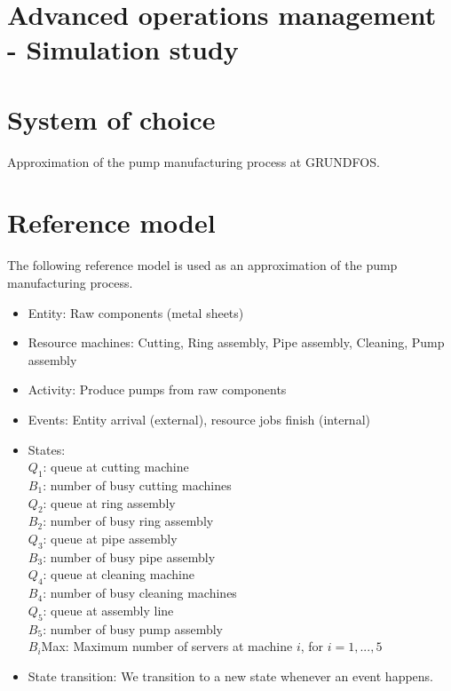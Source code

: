 \documentclass{article}
\begin{document}
\section*{Advanced operations management - Simulation study}

\section{System of choice}
Approximation of the pump manufacturing process at GRUNDFOS.

\section{Reference model}
The following reference model is used as an approximation of the pump manufacturing process.
\begin{itemize}
    \item Entity: Raw components (metal sheets)
    \item Resource machines: Cutting, Ring assembly, Pipe assembly, Cleaning, Pump assembly
    \item Activity: Produce pumps from raw components
    \item Events: Entity arrival (external), resource jobs finish (internal)
    \item States:\\
        $Q_1$: queue at cutting machine \\
        $B_1$: number of busy cutting machines \\
        $Q_2$: queue at ring assembly \\
        $B_2$: number of busy ring assembly \\
        $Q_3$: queue at pipe assembly \\
        $B_3$: number of busy pipe assembly \\
        $Q_4$: queue at cleaning machine \\
        $B_4$: number of busy cleaning machines \\
        $Q_5$: queue at assembly line \\
        $B_5$: number of busy pump assembly\\
        $B_i$Max: Maximum number of servers at machine $i$, for $i=1,...,5$
    \item State transition: We transition to a new state whenever an event happens.
\end{itemize}
\end{document}
